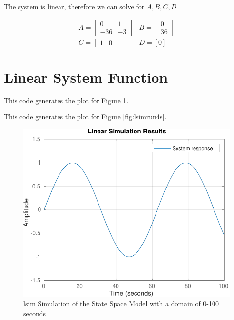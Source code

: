 \documentclass[12pt]{article}
\begin{document}
		The system is linear, therefore we can solve for $A, B, C, D$
		
		$$
		\begin{array}{ll}
			A=\left[\begin{array}{cc}
				0 & 1 \\
				-36 & -3
			\end{array}\right] & B=\left[\begin{array}{c}
				0 \\
				36
			\end{array}\right] \\
			C=\left[\begin{array}{ll}
				1 & 0
			\end{array}\right] & D=[0]
		\end{array}
		$$
	\section{Linear System Function}
		
		This code generates the plot for Figure \ref{fig:lsimrun100s}.
		\newpage
		
		This code generates the plot for Figure \ref{fig:lsimrun4s}.
		\begin{figure}[H]
			\centering
			\includegraphics[width=1\linewidth]{"Code/Fig/lsim_run_100s.pdf"}
			\caption{lsim Simulation of the State Space Model with a domain of 0-100 seconds}
			\label{fig:lsimrun100s}
		\end{figure}
\end{document}
